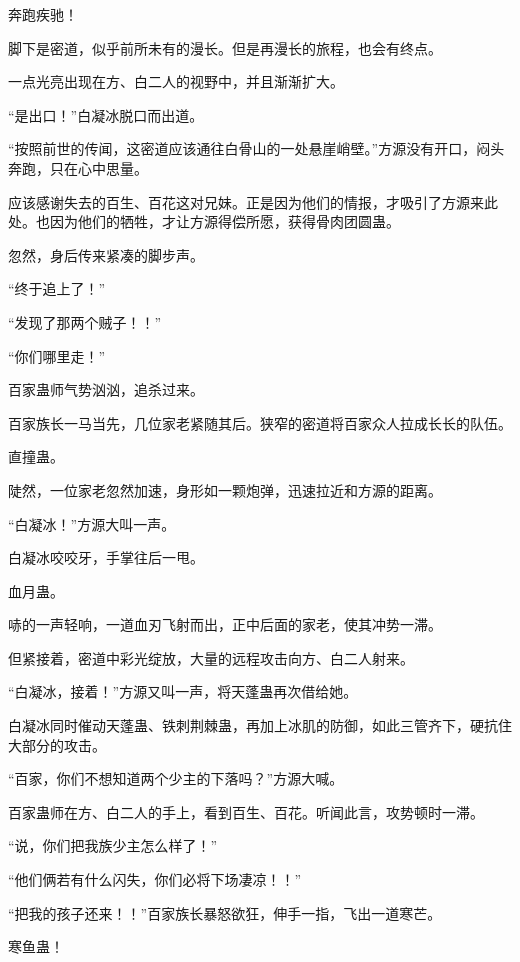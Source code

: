 
\begin{this_body}

奔跑疾驰！

脚下是密道，似乎前所未有的漫长。但是再漫长的旅程，也会有终点。

一点光亮出现在方、白二人的视野中，并且渐渐扩大。

“是出口！”白凝冰脱口而出道。

“按照前世的传闻，这密道应该通往白骨山的一处悬崖峭壁。”方源没有开口，闷头奔跑，只在心中思量。

应该感谢失去的百生、百花这对兄妹。正是因为他们的情报，才吸引了方源来此处。也因为他们的牺牲，才让方源得偿所愿，获得骨肉团圆蛊。

忽然，身后传来紧凑的脚步声。

“终于追上了！”

“发现了那两个贼子！！”

“你们哪里走！”

百家蛊师气势汹汹，追杀过来。

百家族长一马当先，几位家老紧随其后。狭窄的密道将百家众人拉成长长的队伍。

直撞蛊。

陡然，一位家老忽然加速，身形如一颗炮弹，迅速拉近和方源的距离。

“白凝冰！”方源大叫一声。

白凝冰咬咬牙，手掌往后一甩。

血月蛊。

哧的一声轻响，一道血刃飞射而出，正中后面的家老，使其冲势一滞。

但紧接着，密道中彩光绽放，大量的远程攻击向方、白二人射来。

“白凝冰，接着！”方源又叫一声，将天蓬蛊再次借给她。

白凝冰同时催动天蓬蛊、铁刺荆棘蛊，再加上冰肌的防御，如此三管齐下，硬抗住大部分的攻击。

“百家，你们不想知道两个少主的下落吗？”方源大喊。

百家蛊师在方、白二人的手上，看到百生、百花。听闻此言，攻势顿时一滞。

“说，你们把我族少主怎么样了！”

“他们俩若有什么闪失，你们必将下场凄凉！！”

“把我的孩子还来！！”百家族长暴怒欲狂，伸手一指，飞出一道寒芒。

寒鱼蛊！


\end{this_body}
